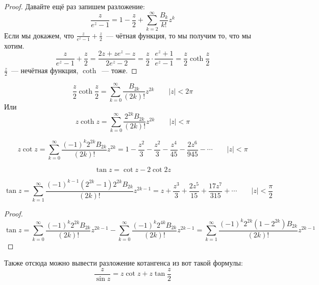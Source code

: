\documentclass{article}
\begin{document}
    \begin{proof}
        Давайте ещё раз запишем разложение:
        $$
        \frac z{e^z-1}=1-\frac z2+\sum\limits_{k=2}^\infty\frac{B_k}{k!}z^k
        $$
        Если мы докажем, что $\frac z{e^z-1}+\frac z2$~--- чётная функция, то мы получим то, что мы хотим.
        $$
        \frac z{e^z-1}+\frac z2=\frac{2z+ze^z-z}{2e^z-2}=\frac z2\cdot\frac{e^z+1}{e^z-1}=\frac z2\coth\frac z2
        $$
        $\frac z2$~--- нечётная функция, $\coth$~--- тоже.
    \end{proof}
    \begin{corollary}
        $$\frac z2\coth\frac z2=\sum\limits_{k=0}^\infty\frac{B_{2k}}{(2k)!}z^{2k}\qquad |z|<2\pi$$
        Или
        $$z\coth z=\sum\limits_{k=0}^\infty\frac{2^{2k}B_{2k}}{(2k)!}z^{2k}\qquad |z|<\pi$$
    \end{corollary}
    \begin{corollary}
        $$z\cot z=\sum\limits_{k=0}^\infty\frac{(-1)^k2^{2k}B_{2k}}{(2k)!}z^{2k}=1-\frac{z^2}3-\frac{z^2}3-\frac{z^4}{45}-\frac{2z^6}{945}-\cdots\qquad |z|<\pi$$
    \end{corollary}
    \begin{claim}
        $$
        \tan z=\cot z-2\cot 2z
        $$
    \end{claim}
    \begin{corollary}
        $$\tan z=\sum\limits_{k=1}^\infty\frac{(-1)^{k-1}(2^{2k}-1)2^{2k}B_{2k}}{(2k)!}z^{2k-1}=z+\frac{z^3}3+\frac{2z^5}{15}+\frac{17z^7}{315}+\cdots\qquad|z|<\frac\pi2$$
    \end{corollary}
    \begin{proof}
        $$\tan z=\sum\limits_{k=0}^\infty\frac{(-1)^k2^{2k}B_{2k}}{(2k)!}z^{2k-1}-\sum\limits_{k=0}^\infty\frac{(-1)^k2^{4k}B_{2k}}{(2k)!}z^{2k-1}=\sum\limits_{k=1}^\infty\frac{(-1)^k2^{2k}(1-2^{2k})B_{2k}}{(2k)!}z^{2k-1}$$
    \end{proof}
    \begin{remark}
        Также отсюда можно вывести разложение котангенса из вот такой формулы:
        $$
        \frac z{\sin z}=z\cot z+z\tan\frac z2
        $$
    \end{remark}
\end{document}
